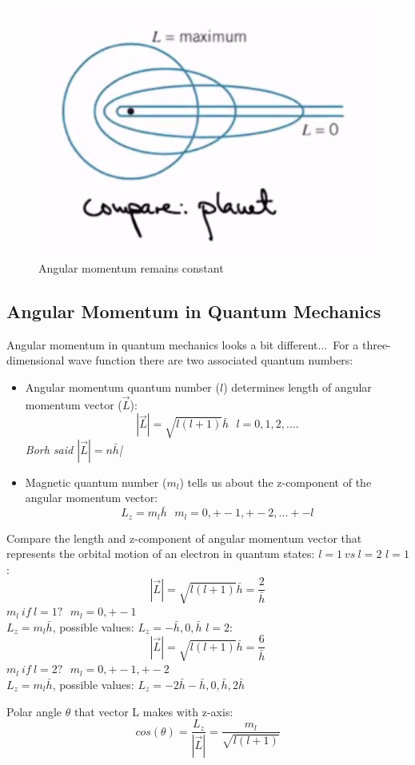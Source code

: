 \documentclass[class=article,crop=false]{standalone}
\begin{document}
\begin{figure}[h!]
	\centering
	\includegraphics[width=0.5\linewidth]{./Images/angular.png}
	\caption{Angular momentum remains constant}
\end{figure}

\subsection{Angular Momentum in Quantum Mechanics}

Angular momentum in quantum mechanics looks a bit different...\
For a three-dimensional wave function there are two associated quantum numbers:

\begin{itemize}
	\item Angular momentum quantum number ($l$) determines length of angular momentum vector ($\vec{L}$):
		$$ |\vec{L}| = \sqrt{l(l+1)} \bar{h} \ \ \ l=0,1,2,....$$
		\emph{Borh said $|\vec{L}| = n \bar{h}$|}
	\item Magnetic quantum number ($m_l$) tells us about the z-component of the angular momentum vector:
		$$ L_z = m_l \bar{h} \ \ \ m_l = 0, +-1, +-2, ... +- l $$
\end{itemize}

\begin{question}[Example]
	Compare the length and z-component of angular momentum vector that represents the orbital motion of an electron in quantum states: $l = 1\ vs\ l=2$
	$l = 1$:
	$$ |\vec{L}| = \sqrt{l(l+1)}\bar{h} = \frac{2}\bar{h} $$
	$m_l\ if\ l=1?\ \ \ m_l = 0, +- 1$ \\
	$L_z = m_l \bar{h}$, possible values: $L_z = -\bar{h}, 0, \bar{h}$
	$l = 2$:
	$$ |\vec{L}| = \sqrt{l(l+1)}\bar{h} = \frac{6}\bar{h} $$
	$m_l\ if\ l=2?\ \ \ m_l = 0, +- 1, +- 2$ \\
	$L_z = m_l \bar{h}$, possible values: $L_z = -2\bar{h}-\bar{h}, 0, \bar{h}, 2\bar{h}$

	Polar angle $\theta$ that vector L makes with z-axis:
	$$ cos(\theta) = \frac{L_z}{|\vec{L}|} = \frac{m_l}{\sqrt{l(l+1)}} $$

\end{question}
\end{document}
